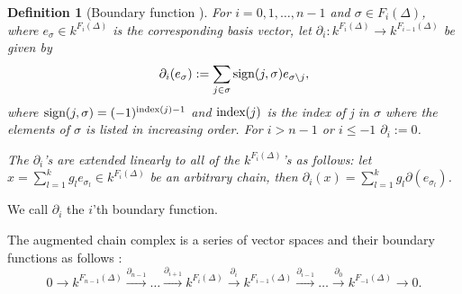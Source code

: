 \documentclass[11pt,a4paper,twoside]{report}
\newtheorem{mydef}[mythm]{Definition}
\begin{document}
\begin{mydef}[Boundary function \cite{Allgaier}]\label{def:boundary}
For $i=0,1,\dots,n-1$ and $\sigma\in F_i(\Delta)$, where $e_\sigma\in k^{F_i(\Delta)}$ is the corresponding basis vector, let $\partial_i: k^{F_i(\Delta)} \to k^{F_{i-1}(\Delta)}$ be given by 
\begin{equation*}
\partial_i(e_\sigma):=\sum_{j\in\sigma}\textnormal{sign}(j,\sigma)e_{\sigma\setminus j} ,
\end{equation*}
where $\textnormal{sign}(j,\sigma) = (-1)^{\textnormal{index}(j)-1}$ and $\textnormal{index}(j)$ is the index of j in $\sigma$ where the elements of $\sigma$ is listed in increasing order. For $i>n-1$ or $i\leq-1$ $\partial_i:=0$. 

The $\partial_i$'s are extended linearly to all of the $k^{F_i(\Delta)}$'s as follows: let $x = \sum_{l=1}^kg_le_{\sigma_l}\in k^{F_i(\Delta)}$ be an arbitrary chain, then $\partial_i(x)=\sum_{l=1}^kg_l\partial (e_{\sigma_l})$.
\end{mydef}
We call $\partial_i$ the $i$'th boundary function.

The augmented chain complex is a series of vector spaces and their boundary functions as follows \cite{Allgaier}:
\begin{equation*}
0\to k^{F_{n-1}(\Delta)}\overset{\partial_{n-1}}{\to}\dots\overset{\partial_{i+1}}{\to} k^{F_{i}(\Delta)}\overset{\partial_{i}}{\to}k^{F_{i-1}(\Delta)}\overset{\partial_{i-1}}{\to}\dots\overset{\partial_{0}}{\to} k^{F_{-1}(\Delta)}\to 0.
\end{equation*}
\end{document}
